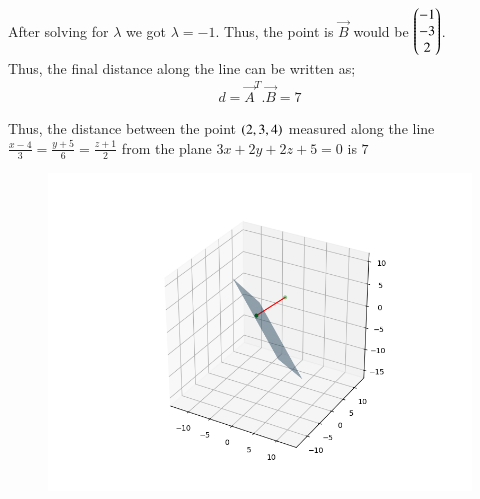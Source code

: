 \documentclass[journal]{IEEEtran}
\begin{document}
After solving for $\lambda$ we got $\lambda=-1$. Thus, the point is $\Vec{B}$ would be $\begin{pmatrix}-1 \\ -3 \\ 2\end{pmatrix}$. \\

Thus, the final distance along the line can be written as;
\begin{align}
d=\Vec{A}^T.\Vec{B}=7
\end{align}

Thus, the distance between the point $\left(2,3,4\right)$ measured along the line $\frac{x-4}{3}=\frac{y+5}{6}=\frac{z+1}{2}$ from the plane $3x+2y+2z+5=0$ is $7$

\begin{figure}[H]
\centering
\includegraphics[width=0.8\columnwidth]{figs/img.png}
\caption*{}
\end{figure}
\end{document}
